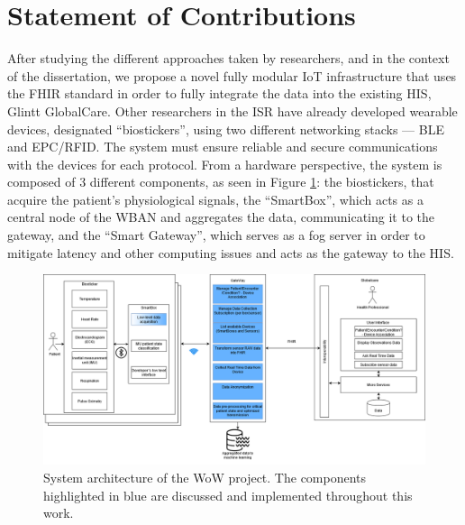 

\section{Statement of Contributions}

After studying the different approaches taken by researchers, and in the context of the dissertation, we propose a novel fully modular \acs{IoT} infrastructure that uses the \acs{FHIR} standard in order to fully integrate the data into the existing \acs{HIS}, Glintt GlobalCare. Other researchers in the \acf{ISR} have already developed wearable devices, designated ``biostickers'', using two different networking stacks — \acs{BLE} and \acs{EPC/RFID}. The system must ensure reliable and secure communications with the devices for each protocol. From a hardware perspective, the system is composed of 3 different components, as seen in Figure \ref{fig:wow-architecture}: the biostickers, that acquire the patient's physiological signals, the ``SmartBox'', which acts as a central node of the WBAN and aggregates the data, communicating it to the gateway, and the ``Smart Gateway'', which serves as a fog server in order to mitigate latency and other computing issues and acts as the gateway to the \acs{HIS}. 

\begin{figure}[H]
    \centering
    \includegraphics[width=\linewidth]{images/wow-architecture.png}
    \caption[System architecture of the \acs{WoW} project.]{System architecture of the \acs{WoW} project. The components highlighted in blue are discussed and implemented throughout this work.}
    \label{fig:wow-architecture}
\end{figure}

